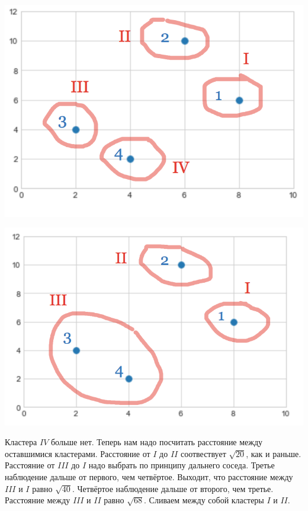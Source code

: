 \documentclass[12pt, a4paper, oneside]{article}
\begin{document}
{\begin{minipage}[t]{0.45\textwidth}
	\includegraphics[scale=0.25]{ekl1.png}
\end{minipage}
\hfill
\begin{minipage}[t]{0.45\textwidth}
	\includegraphics[scale=0.25]{ekl2.png}
\end{minipage}


Кластера $IV$ больше нет. Теперь нам надо посчитать расстояние между оставшимися кластерами. Расстояние от $I$ до $II$ соотвествует $\sqrt{20}$, как и раньше. Расстояние от $III$ до $I$ надо выбрать по принципу дальнего соседа. Третье наблюдение дальше от первого, чем четвёртое. Выходит, что расстояние между $III$ и $I$ равно $\sqrt{40}$. Четвёртое наблюдение дальше от второго, чем третье. Расстояние между $III$ и $II$ равно $\sqrt{68}$. Сливаем между собой кластеры $I$ и $II$. 

}
\end{document}
